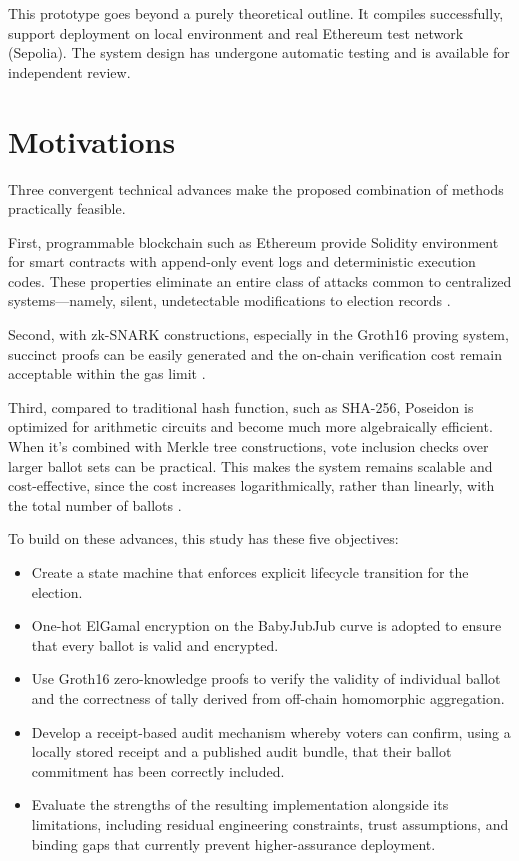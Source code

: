 This prototype goes beyond a purely theoretical outline. It compiles successfully, support deployment on local environment and real Ethereum test network (Sepolia). The system design has undergone automatic testing and is available for independent review.


\section{Motivations}

Three convergent technical advances make the proposed combination of methods practically feasible.

First, programmable blockchain such as Ethereum provide Solidity environment for smart contracts with append-only event logs and deterministic execution codes. These properties eliminate an entire class of attacks common to centralized systems---namely, silent, undetectable modifications to election records \cite{nakamoto2008,wood2014}.

Second, with zk-SNARK constructions, especially in the Groth16 proving system, succinct proofs can be easily generated and the on-chain verification cost remain acceptable within the gas limit \cite{groth2016}.

Third, compared to traditional hash function, such as SHA-256, Poseidon is optimized for arithmetic circuits and become much more algebraically efficient. When it's combined with Merkle tree constructions, vote inclusion checks over larger ballot sets can be practical. This makes the system remains scalable and cost-effective, since the cost increases logarithmically, rather than linearly, with the total number of ballots \cite{poseidon2021,merkle1988}.

To build on these advances, this study has these five objectives:

\begin{itemize}
    \item Create a state machine that enforces explicit lifecycle transition for the election.
    \item One-hot ElGamal encryption on the BabyJubJub curve is adopted to ensure that every ballot is valid and encrypted.
    \item Use Groth16 zero-knowledge proofs to verify the validity of individual ballot and the correctness of tally derived from off-chain homomorphic aggregation.
    \item Develop a receipt-based audit mechanism whereby voters can confirm, using a locally stored receipt and a published audit bundle, that their ballot commitment has been correctly included.
    \item Evaluate the strengths of the resulting implementation alongside its limitations, including residual engineering constraints, trust assumptions, and binding gaps that currently prevent higher-assurance deployment.
\end{itemize}

